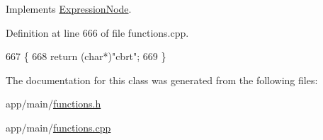 Implements \hyperlink{classExpressionNode_a42a5e9562b0f645a19dcc83f698069b5}{Expression\+Node}.



Definition at line 666 of file functions.\+cpp.


\begin{DoxyCode}
667 \{
668     \textcolor{keywordflow}{return} (\textcolor{keywordtype}{char}*)\textcolor{stringliteral}{"cbrt"};
669 \}
\end{DoxyCode}


The documentation for this class was generated from the following files\+:\begin{DoxyCompactItemize}
\item 
app/main/\hyperlink{functions_8h}{functions.\+h}\item 
app/main/\hyperlink{functions_8cpp}{functions.\+cpp}\end{DoxyCompactItemize}
